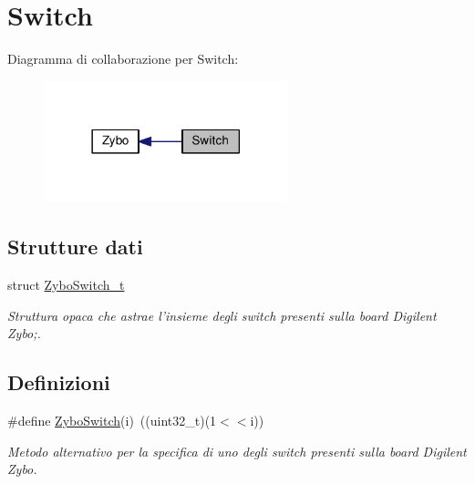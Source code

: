 \hypertarget{group___switch}{\section{Switch}
\label{group___switch}
}
Diagramma di collaborazione per Switch\+:\nopagebreak
\begin{figure}[H]
\begin{center}
\leavevmode
\includegraphics[width=201pt]{group___switch}
\end{center}
\end{figure}
\subsection*{Strutture dati}
\begin{DoxyCompactItemize}
\item 
struct \hyperlink{struct_zybo_switch__t}{Zybo\+Switch\+\_\+t}
\begin{DoxyCompactList}\small\item\em Struttura opaca che astrae l'insieme degli switch presenti sulla board Digilent Zybo;. \end{DoxyCompactList}\end{DoxyCompactItemize}
\subsection*{Definizioni}
\begin{DoxyCompactItemize}
\item 
\#define \hyperlink{group___switch_ga1c463f6e1e3a43f68109c176772ce5cc}{Zybo\+Switch}(i)~((uint32\+\_\+t)(1$<$$<$i))
\begin{DoxyCompactList}\small\item\em Metodo alternativo per la specifica di uno degli switch presenti sulla board Digilent Zybo. \end{DoxyCompactList}\end{DoxyCompactItemize}

